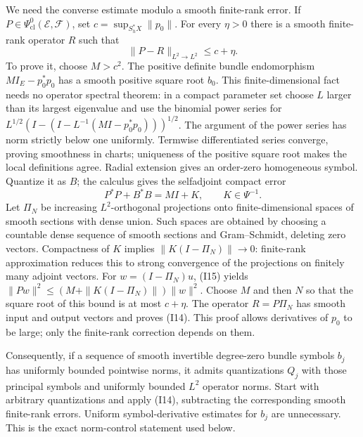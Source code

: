 \documentclass[
  11pt,
]{article}
\makeatletter
\let\ReaderOriginalAnchorStart\hyper@anchorstart
\let\ReaderOriginalAnchorEnd\hyper@anchorend
\let\ReaderPendingAliases\@empty
\def\ReaderArmAliases#1{\gdef\ReaderPendingAliases{#1}}
\def\hyper@anchorstart#1{\ReaderIfNativeAnchorTF{#1}{\ReaderPendingAliases\global\let\ReaderPendingAliases\@empty}{}\ReaderOriginalAnchorStart{#1}}
\makeatother
\begin{document}
We need the converse estimate modulo a smooth finite-rank error. If
\(P\in\Psi^0_{\mathrm{cl}}(\mathcal E,\mathcal F)\), set
\(c=\sup_{S_h^*X}\|p_0\|\). For every \(\eta>0\) there is a smooth
finite-rank operator \(R\) such that \[
\|P-R\|_{L^2\to L^2}\leq c+\eta.
\tag{I14}
\] To prove it, choose \(M>c^2\). The positive definite bundle
endomorphism \(M I_E-p_0^*p_0\) has a smooth positive square root
\(b_0\). This finite-dimensional fact needs no operator spectral
theorem: in a compact parameter set choose \(L\) larger than its largest
eigenvalue and use the binomial power series for
\(L^{1/2}(I-(I-L^{-1}(M I-p_0^*p_0)))^{1/2}\). The argument of the power
series has norm strictly below one uniformly. Termwise differentiated
series converge, proving smoothness in charts; uniqueness of the
positive square root makes the local definitions agree. Radial extension
gives an order-zero homogeneous symbol. Quantize it as \(B\); the
calculus gives the selfadjoint compact error \[
P^*P+B^*B=M I+K,\qquad K\in\Psi^{-1}.
\tag{I15}
\] Let \(\Pi_N\) be increasing \(L^2\)-orthogonal projections onto
finite-dimensional spaces of smooth sections with dense union. Such
spaces are obtained by choosing a countable dense sequence of smooth
sections and Gram--Schmidt, deleting zero vectors. Compactness of \(K\)
implies \(\|K(I-\Pi_N)\|\to0\): finite-rank approximation reduces this
to strong convergence of the projections on finitely many adjoint
vectors. For \(w=(I-\Pi_N)u\), (I15) yields
\(\|Pw\|^2\leq(M+\|K(I-\Pi_N)\|)\|w\|^2\). Choose \(M\) and then \(N\)
so that the square root of this bound is at most \(c+\eta\). The
operator \(R=P\Pi_N\) has smooth input and output vectors and proves
(I14). This proof allows derivatives of \(p_0\) to be large; only the
finite-rank correction depends on them.

Consequently, if a sequence of smooth invertible degree-zero bundle
symbols \(b_j\) has uniformly bounded pointwise norms, it admits
quantizations \(Q_j\) with those principal symbols and uniformly bounded
\(L^2\) operator norms. Start with arbitrary quantizations and apply
(I14), subtracting the corresponding smooth finite-rank errors. Uniform
symbol-derivative estimates for \(b_j\) are unnecessary. This is the
exact norm-control statement used below.

\ReaderArmAliases{\ReaderOriginalAnchorStart{AN03-GSI-005}\ReaderOriginalAnchorEnd\begingroup\expandafter\def\csname @currentHref\endcsname{AN03-GSI-005}\label{AN03-GSI-005}\endgroup\ReaderOriginalAnchorStart{an03-gsi-005-ellipticity-survives-an-operator-norm-limit}\ReaderOriginalAnchorEnd\begingroup\expandafter\def\csname @currentHref\endcsname{an03-gsi-005-ellipticity-survives-an-operator-norm-limit}\label{an03-gsi-005-ellipticity-survives-an-operator-norm-limit}\endgroup\ReaderOriginalAnchorStart{5-ellipticity-survives-an-operator-norm-limit}\ReaderOriginalAnchorEnd\begingroup\expandafter\def\csname @currentHref\endcsname{5-ellipticity-survives-an-operator-norm-limit}\label{5-ellipticity-survives-an-operator-norm-limit}\endgroup}
\end{document}
